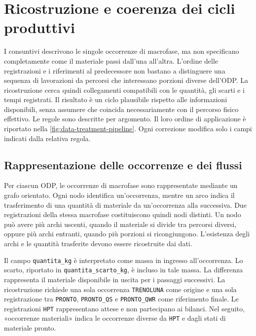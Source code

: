 \section{Ricostruzione e coerenza dei cicli produttivi}
\label{sec:cycle-reconstruction}

I consuntivi descrivono le singole occorrenze di macrofase, ma non specificano completamente come il materiale passi dall'una all'altra. L'ordine delle registrazioni e i riferimenti al predecessore non bastano a distinguere una sequenza di lavorazioni da percorsi che interessano porzioni diverse dell'ODP. La ricostruzione cerca quindi collegamenti compatibili con le quantità, gli scarti e i tempi registrati. Il risultato è un ciclo plausibile rispetto alle informazioni disponibili, senza assumere che coincida necessariamente con il percorso fisico effettivo. Le regole sono descritte per argomento. Il loro ordine di applicazione è riportato nella \cref{fig:data-treatment-pipeline}. Ogni correzione modifica solo i campi indicati dalla relativa regola.

\subsection{Rappresentazione delle occorrenze e dei flussi}
\label{sec:material-flow-representation}

Per ciascun ODP, le occorrenze di macrofase sono rappresentate mediante un grafo orientato. Ogni nodo identifica un'occorrenza, mentre un arco indica il trasferimento di una quantità di materiale da un'occorrenza alla successiva. Due registrazioni della stessa macrofase costituiscono quindi nodi distinti. Un nodo può avere più archi uscenti, quando il materiale si divide tra percorsi diversi, oppure più archi entranti, quando più porzioni si ricongiungono. L'esistenza degli archi e le quantità trasferite devono essere ricostruite dai dati.

Il campo \texttt{quantita\_kg} è interpretato come massa in ingresso all'occorrenza. Lo scarto, riportato in \texttt{quantita\_scarto\_kg}, è incluso in tale massa. La differenza rappresenta il materiale disponibile in uscita per i passaggi successivi. La ricostruzione richiede una sola occorrenza \texttt{TRENOLUNA} come origine e una sola registrazione tra \texttt{PRONTO}, \texttt{PRONTO\_QS} e \texttt{PRONTO\_QWR} come riferimento finale. Le registrazioni \texttt{HPT} rappresentano attese e non partecipano ai bilanci. Nel seguito, «occorrenze materiali» indica le occorrenze diverse da \texttt{HPT} e dagli stati di materiale pronto.

